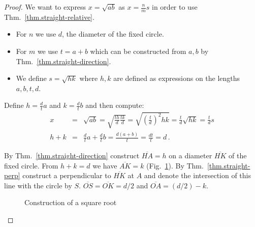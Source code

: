 \begin{proof}
We want to express $x=\sqrt{ab}$ as $x=\displaystyle\frac{n}{m}s$ in order to use Thm.~\ref{thm.straight-relative}.
\begin{itemize}
\setlength{\itemsep}{0pt}
\item For $n$ we use $d$, the diameter of the fixed circle.
\item For $m$ we use $t=a+b$ which can be constructed from $a,b$ by Thm.~\ref{thm.straight-direction}.
\item We define $s=\sqrt{hk}$ where $h,k$ are defined as expressions on the lengths $a,b,t,d$.
\end{itemize}
Define $h=\displaystyle\frac{d}{t}a$ and $k=\displaystyle\frac{d}{t}b$ and then compute:
\begin{eqnarray*}
x&=&\sqrt{ab}=\sqrt{\frac{th}{d}\frac{tk}{d}}=\sqrt{\left(\frac{t}{d}\right)^2hk}=\frac{t}{d}\sqrt{hk}=\frac{t}{d}s\\
h+k &=& \frac{d}{t}a + \frac{d}{t}b = \frac{d(a+b)}{t} = \frac{dt}{t} = d\,.
\end{eqnarray*}

By Thm.~\ref{thm.straight-direction} construct $\overline{HA}= h$ on a diameter $\overline{HK}$ of the fixed circle. From $h+k=d$ we have $\overline{AK}=k$ (Fig.~\ref{f.se-sqrt}). By Thm.~\ref{thm.straight-perp} construct a perpendicular to $\overline{HK}$ at $A$ and denote the intersection of this line with the circle by $S$. $\overline{OS}=\overline{OK}=d/2$ and $\overline{OA}=(d/2)-k$. 
\begin{figure}[ht]
\begin{center}
\end{center}
\caption{Construction of a square root}\label{f.se-sqrt}
\end{figure}


\end{proof}
